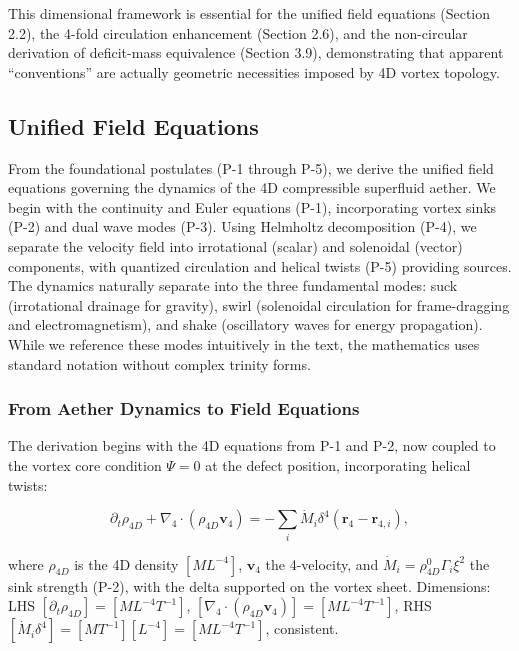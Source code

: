 This dimensional framework is essential for the unified field equations (Section 2.2), the 4-fold circulation enhancement (Section 2.6), and the non-circular derivation of deficit-mass equivalence (Section 3.9), demonstrating that apparent ``conventions'' are actually geometric necessities imposed by 4D vortex topology.

\subsection{Unified Field Equations}

From the foundational postulates (P-1 through P-5), we derive the unified field equations governing the dynamics of the 4D compressible superfluid aether. We begin with the continuity and Euler equations (P-1), incorporating vortex sinks (P-2) and dual wave modes (P-3). Using Helmholtz decomposition (P-4), we separate the velocity field into irrotational (scalar) and solenoidal (vector) components, with quantized circulation and helical twists (P-5) providing sources. The dynamics naturally separate into the three fundamental modes: suck (irrotational drainage for gravity), swirl (solenoidal circulation for frame-dragging and electromagnetism), and shake (oscillatory waves for energy propagation). While we reference these modes intuitively in the text, the mathematics uses standard notation without complex trinity forms.

\subsubsection{From Aether Dynamics to Field Equations}

The derivation begins with the 4D equations from P-1 and P-2, now coupled to the vortex core condition $\Psi=0$ at the defect position, incorporating helical twists:

\begin{equation}
\partial_t \rho_{4D} + \nabla_4 \cdot (\rho_{4D} \mathbf{v}_4) = -\sum_i \dot{M}_i \delta^4(\mathbf{r}_4 - \mathbf{r}_{4,i}),
\end{equation}

where $\rho_{4D}$ is the 4D density $[M L^{-4}]$, $\mathbf{v}_4$ the 4-velocity, and $\dot{M}_i = \rho_{4D}^0 \Gamma_i \xi^2$ the sink strength (P-2), with the delta supported on the vortex sheet. Dimensions: LHS $[\partial_t \rho_{4D}] = [M L^{-4} T^{-1}]$, $[\nabla_4 \cdot (\rho_{4D} \mathbf{v}_4)] = [M L^{-4} T^{-1}]$, RHS $[\dot{M}_i \delta^4] = [M T^{-1}] [L^{-4}] = [M L^{-4} T^{-1}]$, consistent.

